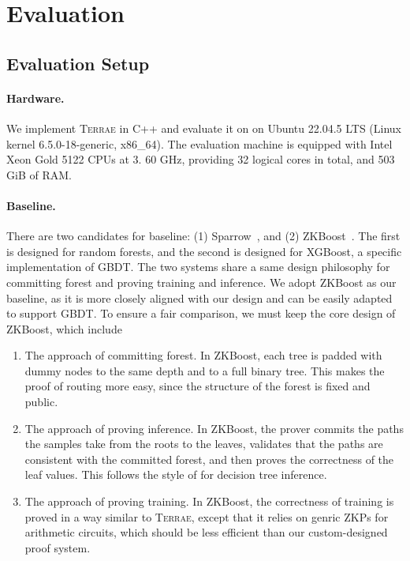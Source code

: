 \section{Evaluation}\label{sec:evaluation}

\subsection{Evaluation Setup}

\paragraph{Hardware.} We implement \textsc{Terrae} in C++ and evaluate
it on on Ubuntu 22.04.5 LTS (Linux kernel 6.5.0-18-generic, x86\_64).
The evaluation machine is equipped with Intel Xeon Gold 5122 CPUs at 3. 
60 GHz, providing 32 logical  
cores in total, and 503 GiB of RAM.

\paragraph{Baseline.}
There are two candidates for baseline: (1) Sparrow~\cite{sparrow24}, and (2) ZKBoost~\cite{zkboost26}. The first is 
designed for random forests, and the second is designed for XGBoost,
a specific implementation of GBDT.
The two systems share a same design philosophy for
committing forest and proving training and inference.
We adopt ZKBoost as our baseline, as it is more closely aligned with our design and can be easily adapted to support GBDT.
To ensure a fair comparison, we must keep the core design of ZKBoost,
which include
\begin{enumerate}
    \item The approach of committing forest.
        In ZKBoost, each tree is padded with
        dummy nodes to the same depth
        and to a full binary tree.
        This makes the proof of routing more easy,
        since the structure of the forest is fixed and public.
    \item The approach of proving inference.
        In ZKBoost, the prover commits the paths
        the samples take
        from the roots to the leaves,
        validates that the paths are consistent with the committed forest,
        and then proves the correctness of the leaf values.
        This follows the style
        of \cite{zkdt20} for decision tree inference.
    \item The approach of proving training.
        In ZKBoost, the correctness of training is proved
        in a way similar to \textsc{Terrae},
        except that it relies on genric ZKPs for arithmetic circuits, which should be less efficient than our custom-designed proof system.
\end{enumerate}

